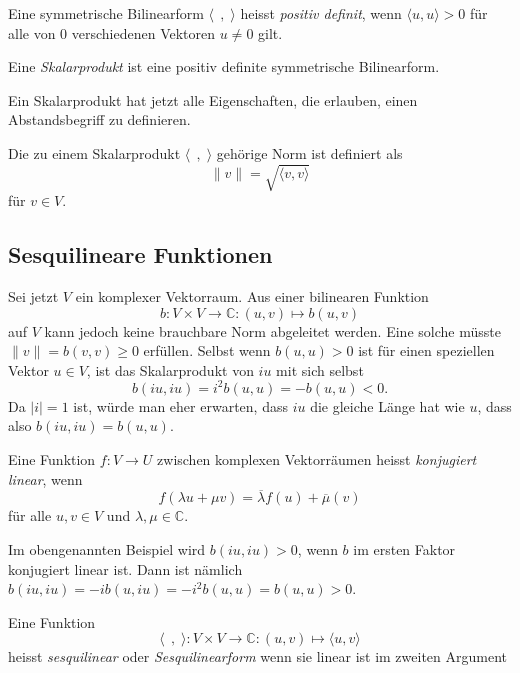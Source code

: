 \begin{definition}
Eine symmetrische Bilinearform $\langle\;\,,\;\rangle$
heisst {\em positiv definit}, wenn $\langle u,u\rangle > 0$ 
für alle von 0 verschiedenen Vektoren $u\ne 0$ gilt.
\end{definition}

\begin{definition}
Eine {\em Skalarprodukt} ist eine positiv definite symmetrische Bilinearform.
%
\end{definition}

Ein Skalarprodukt hat jetzt alle Eigenschaften, die erlauben, einen 
Abstandsbegriff zu definieren.

\begin{definition}
Die zu einem Skalarprodukt $\langle\;\,,\;\rangle$ gehörige Norm ist
definiert als
\[
\| v\|
=
\sqrt{\langle v,v\rangle}
\]
für $v\in V$.
\end{definition}

%
%
\subsection{Sesquilineare Funktionen}
Sei jetzt $V$ ein komplexer Vektorraum.
Aus einer bilinearen Funktion
\[
b\colon V\times V \to \mathbb{C} : (u,v) \mapsto b(u,v)
\]
auf $V$ kann jedoch keine brauchbare Norm abgeleitet werden.
Eine solche müsste $\| v\|=b(v,v)\ge 0$ erfüllen.
Selbst wenn $b(u,u)> 0$ ist für einen speziellen Vektor $u\in V$,
ist das Skalarprodukt von $iu$ mit sich selbst
\[
b(iu,iu)
=
i^2 b(u,u)
=
-b(u,u)
<
0.
\]
Da $|i|=1$ ist, würde man eher erwarten, dass $iu$ die gleiche 
Länge hat wie $u$, dass also $b(iu,iu)=b(u,u)$.

\begin{definition}
Eine Funktion $f\colon V\to U$ zwischen komplexen Vektorräumen 
heisst {\em konjugiert linear}, wenn 
\[
f(\lambda u + \mu v)
=
\overline{\lambda} f(u) + \overline{\mu} (v)
\]
für alle $u,v\in V$ und $\lambda,\mu\in \mathbb{C}$.
\end{definition}

Im obengenannten Beispiel wird $b(iu,iu)>0$, wenn $b$ im ersten Faktor
konjugiert linear ist.
Dann ist nämlich $b(iu,iu) = -ib(u,iu) = -i^2 b(u,u) = b(u,u)>0$.

\begin{definition}
Eine Funktion
\[
\langle\;\,,\;\rangle
\colon
V\times V \to \mathbb{C}
:
(u,v) \mapsto \langle u,v\rangle
\]
heisst {\em sesquilinear} oder {\em Sesquilinearform}
wenn sie linear ist im zweiten Argument
\end{definition}

